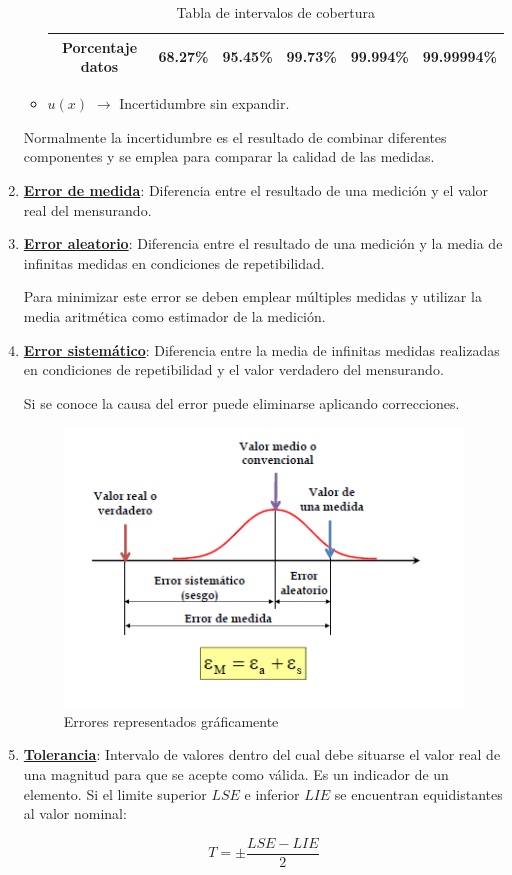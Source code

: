 \begin{enumerate}
\begin{itemize}
\begin{table}[htb]
\begin{tabular}{|c|c|c|c|c|c|}
				\hline
				Porcentaje datos&68.27\% & 95.45\% & 99.73\% & 99.994\% & 99.99994\% \\
				
				\hline
			\end{tabular}
			\caption{Tabla de intervalos de cobertura}
			\label{tab:your-table-label}
		\end{table}
		
		\item $u(x)$ $\rightarrow$ Incertidumbre sin expandir.
	\end{itemize} 
	
	Normalmente la incertidumbre es el resultado de combinar diferentes componentes y se emplea para comparar la calidad de las medidas.
	\item \underline{\textbf{Error de medida}}: Diferencia entre el resultado de una	medición y el valor real del mensurando.
	\item \underline{\textbf{Error aleatorio}}: Diferencia entre el resultado de una medición y la media de infinitas medidas en condiciones de repetibilidad.
	
	
	Para minimizar este error se deben emplear múltiples medidas y utilizar la media aritmética como estimador de la medición.
	\item \underline{\textbf{Error sistemático}}: Diferencia entre la media de infinitas medidas realizadas en condiciones de repetibilidad y el valor verdadero del mensurando.
	
	
	Si se conoce la causa del error puede eliminarse aplicando correcciones.
	
	\begin{figure} [H]
		\centering
		\includegraphics[width=1\textwidth]{imagenesTema1/errormedida.png}  
		\caption{Errores representados gráficamente}
		\label{fig:sample}
	\end{figure}
	\item \underline{\textbf{Tolerancia}}: Intervalo de valores dentro del cual debe situarse el valor real de una magnitud para que se acepte como válida. Es un indicador de un elemento.
	Si el limite superior $LSE$ e inferior $LIE$ se encuentran equidistantes al valor nominal:
	
	\[T=\pm \frac{LSE - LIE}{2}\]

\end{enumerate}

